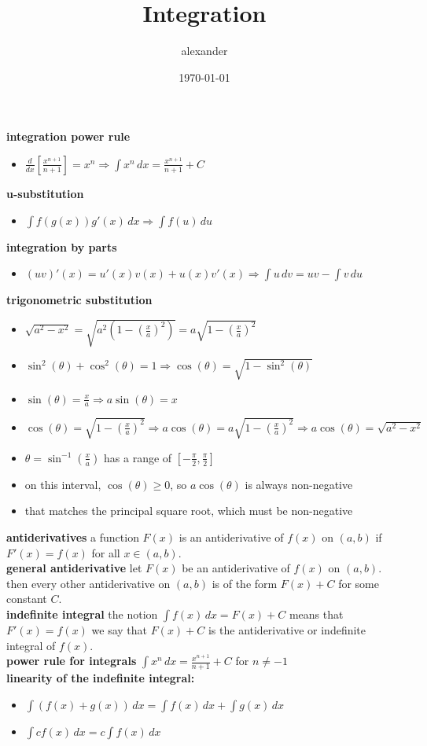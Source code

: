 \documentclass{article}
\title{Integration}
\author{alexander}
\date{\today}
\begin{document}
\maketitle

\textbf{integration power rule}
	\begin{itemize}	
		\item $\frac{d}{dx}[\frac{x^{n+1}}{n+1}] = x^n \Rightarrow \int x^n\,dx = \frac{x^{n+1}}{n+1} + C$
	\end{itemize}

\textbf{u-substitution}
	\begin{itemize}	
		\item $\int f(g(x))g'(x)\,dx \Rightarrow \int f(u)\,du$
	\end{itemize}

\textbf{integration by parts}
	\begin{itemize}
		\item $(uv)'(x) = u'(x)v(x) + u(x)v'(x) \Rightarrow \int u\,dv = uv - \int v\,du$
	\end{itemize}

\textbf{trigonometric substitution}
	\begin{itemize}
		\item $\sqrt{a^2 - x^2} = \sqrt{a^2(1 - (\frac{x}{a})^2)} = a\sqrt{1 - (\frac{x}{a})^2}$
		\item $\sin^2(\theta) + \cos^2(\theta) = 1 \Rightarrow \cos(\theta) = \sqrt{1 - \sin^2(\theta)}$
		\item $\sin(\theta) = \frac{x}{a} \Rightarrow a\sin(\theta) = x$
		\item $\cos(\theta) = \sqrt{1 - (\frac{x}{a})^2} \Rightarrow a\cos(\theta) = a\sqrt{1 - (\frac{x}{a})^2} \Rightarrow a\cos(\theta) = \sqrt{a^2 - x^2}$
		\item $\theta = \sin^{-1}(\frac{x}{a})$ has a range of $[-\frac{\pi}{2}, \frac{\pi}{2}]$
		\item on this interval, $\cos(\theta) \geq 0$, so $a\cos(\theta)$ is always non-negative
		\item that matches the principal square root, which must be non-negative
	\end{itemize}


\textbf{antiderivatives} a function $F(x)$ is an antiderivative of $f(x)$ on $(a, b)$ if $F'(x) = f(x)$ for all $x \in (a, b)$.\\
\textbf{general antiderivative} let $F(x)$ be an antiderivative of $f(x)$ on $(a, b)$. then every other antiderivative on $(a, b)$ is of the form $F(x) + C$ for some constant $C$.\\
\textbf{indefinite integral} the notion $\int f(x)\,dx = F(x) + C$ means that $F'(x) = f(x)$ we say that $F(x) + C$ is the antiderivative or indefinite integral of $f(x)$.\\
\textbf{power rule for integrals} $\int x^n\,dx = \frac{x^{n + 1}}{n + 1} + C$ for $n \neq -1$\\ 
\textbf{linearity of the indefinite integral:}
	\begin{itemize}
		\item $\int (f(x) + g(x))\,dx = \int f(x)\,dx + \int g(x)\,dx$
		\item $\int cf(x)\,dx = c\int f(x)\,dx$
	\end{itemize}
\end{document}
